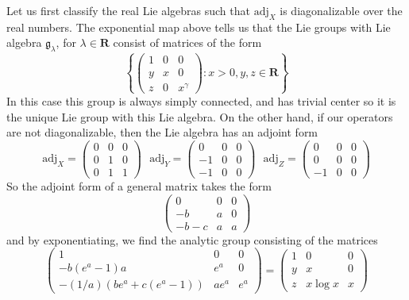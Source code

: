 Let us first classify the real Lie algebras such that $\text{adj}_X$ is diagonalizable over the real numbers. The exponential map above tells us that the Lie groups with Lie algebra $\mathfrak{g}_\lambda$, for $\lambda \in \mathbf{R}$ consist of matrices of the form
%
\[ \left\{ \begin{pmatrix} 1 & 0 & 0 \\ y & x & 0 \\ z & 0 & x^\gamma \end{pmatrix} : x > 0, y,z \in \mathbf{R} \right\} \]
%
In this case this group is always simply connected, and has trivial center so it is the unique Lie group with this Lie algebra. On the other hand, if our operators are not diagonalizable, then the Lie algebra has an adjoint form
%
\[ \text{adj}_X = \begin{pmatrix} 0 & 0 & 0 \\ 0 & 1 & 0 \\ 0 & 1 & 1 \end{pmatrix}\ \ \ \text{adj}_Y = \begin{pmatrix} 0 & 0 & 0 \\ -1 & 0 & 0 \\ -1 & 0 & 0 \end{pmatrix}\ \ \ \text{adj}_Z = \begin{pmatrix} 0 & 0 & 0 \\ 0 & 0 & 0 \\ -1 & 0 & 0 \end{pmatrix} \]
%
So the adjoint form of a general matrix takes the form
%
\[ \begin{pmatrix} 0 & 0 & 0 \\ -b & a & 0 \\ -b-c & a & a \end{pmatrix} \]
%
and by exponentiating, we find the analytic group consisting of the matrices
%
\[ \begin{pmatrix} 1 & 0 & 0 \\ -b(e^a - 1)a & e^a & 0 \\ -(1/a)(be^a + c(e^a - 1)) & ae^a & e^a \end{pmatrix} = \begin{pmatrix} 1 & 0 & 0 \\ y & x & 0 \\ z & x\log x & x \end{pmatrix} \]


